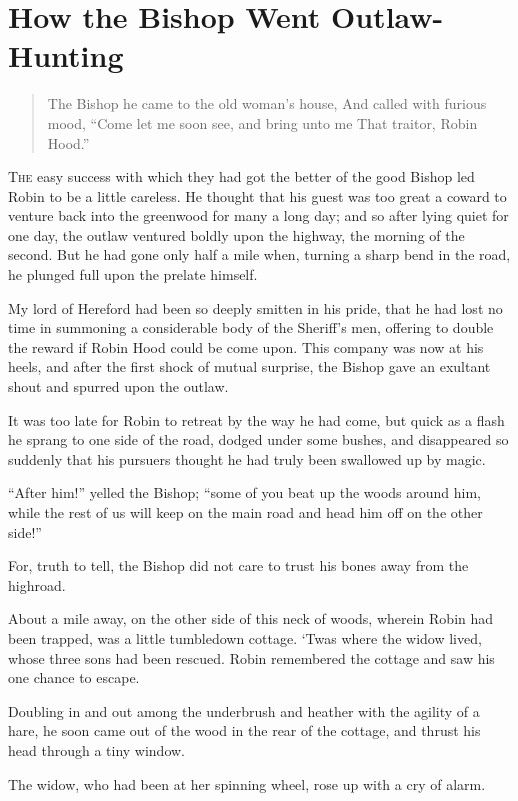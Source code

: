 \chapter{How the Bishop Went Outlaw-Hunting}

\begin{quote}
The Bishop he came to the old woman’s house,
And called with furious mood,
“Come let me soon see, and bring unto me
That traitor, Robin Hood.”
\end{quote}

\lettrine{T}{he} easy success with which they had got the better of the good Bishop
led Robin to be a little careless. He thought that his guest was too
great a coward to venture back into the greenwood for many a long day;
and so after lying quiet for one day, the outlaw ventured boldly upon
the highway, the morning of the second. But he had gone only half a mile
when, turning a sharp bend in the road, he plunged full upon the prelate
himself.

My lord of Hereford had been so deeply smitten in his pride, that he had
lost no time in summoning a considerable body of the Sheriff's men,
offering to double the reward if Robin Hood could be come upon. This
company was now at his heels, and after the first shock of mutual
surprise, the Bishop gave an exultant shout and spurred upon the outlaw.

It was too late for Robin to retreat by the way he had come, but quick
as a flash he sprang to one side of the road, dodged under some bushes,
and disappeared so suddenly that his pursuers thought he had truly been
swallowed up by magic.

``After him!'' yelled the Bishop; ``some of you beat up the woods around
him, while the rest of us will keep on the main road and head him off on
the other side!''

For, truth to tell, the Bishop did not care to trust his bones away from
the highroad.

About a mile away, on the other side of this neck of woods, wherein
Robin had been trapped, was a little tumbledown cottage. `Twas where the
widow lived, whose three sons had been rescued. Robin remembered the
cottage and saw his one chance to escape.

Doubling in and out among the underbrush and heather with the agility of
a hare, he soon came out of the wood in the rear of the cottage, and
thrust his head through a tiny window.

The widow, who had been at her spinning wheel, rose up with a cry of
alarm.

